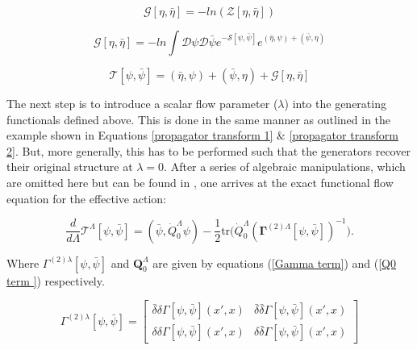 \documentclass[12pt]{article}
\begin{document}
\begin{equation} \label{Greens function functional}
    \mathcal{G}[\eta, \bar{\eta}] = -ln(\mathcal{Z}[\eta, \bar{\eta}])
\end{equation}

\begin{equation}\label{G term in effective action}
    \mathcal{G}[\eta, \bar{\eta}] = 
    -ln \int{\mathcal{D}\psi \mathcal{D} \bar{\psi}e^{-\mathcal{S}[\psi, \bar{\psi}]}e^{(\bar{\eta}, \psi) +(\bar{\psi}, \eta)}}
\end{equation}

\begin{equation} \label{Effective action}
    \mathcal{T}[\psi, \bar{\psi}] = (\bar{\eta},\psi) + (\bar{\psi},\eta) + \mathcal{G}[\eta, \bar{\eta}]
\end{equation}


\noindent The next step is to introduce a scalar flow parameter ($\lambda$) into the generating functionals defined above. This is done in the same manner as outlined in the example shown in Equations \ref{propagator transform 1} $\&$ \ref{propagator transform 2}. 
But, more generally, this has to be performed such that the generators recover their original structure at $\lambda = 0 $.
After a series of algebraic manipulations, which are omitted here but can be found in \cite{metzner2012functional}, one arrives at the exact functional flow equation for the effective action:


\begin{equation} \label{eq:ExactFunctionalFlowEquation}
    \frac{d}{d\Lambda} \mathcal{T}^{\Lambda}[\psi, \bar{\psi}] = (\bar{\psi}, \dot{Q}_0^{\Lambda} \psi) - \frac{1}{2} \text{tr} \big( \dot{Q}_0^{\Lambda} (\boldsymbol{\Gamma}^{(2)\Lambda}[\psi, \bar{\psi}])^{-1} \big).
\end{equation}

\noindent Where $\Gamma^{(2)\lambda}[\psi, \bar{\psi}]$ and  $\textbf{Q}_0^{\Lambda}$ are given by equations (\ref{Gamma term}) and (\ref{Q0 term }) respectively.



\begin{equation}\label{Gamma term}
\Gamma^{(2)\lambda}[\psi, \bar{\psi}] = 
\begin{bmatrix}
\bar{\delta} \delta \Gamma[\psi, \bar{\psi}](x',x) & \bar{\delta} \bar{\delta} \Gamma[\psi, \bar{\psi}](x',x) \\
\delta \delta \Gamma[\psi, \bar{\psi}](x',x)  & \delta \bar{\delta} \Gamma[\psi, \bar{\psi}](x',x)
\end{bmatrix}
\end{equation}
\end{document}
